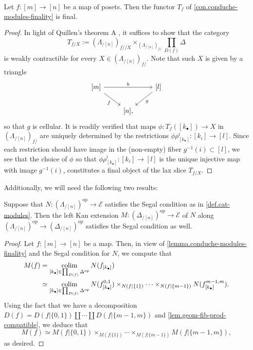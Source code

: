 \documentclass[a4paper, 11pt]{amsart}
\numberwithin{theorem}{section}
\theoremstyle{definition}
\newcommand{\op}{\mathrm{op}}
\def\colim{\qopname\relax m{colim}}
\newcommand{\E}{\mathscr{E}}
\begin{document}
\begin{lemma}\label{lemma.conduche-modules-finality}
	Let $f : [m] \rightarrow [n]$ be a map of posets. Then the functor $T_f$ of \cref{con.conduche-modules-finality} is final.
\end{lemma}
\begin{proof}
	In light of Quillen's theorem A \cite[Theorem 4.1.3.1]{HTT}, it suffices to show that the category 
	$$
	\textstyle T_{f/X} := (\Lambda_{/[n]})_{f//X} \times_{(\Lambda_{/[n]})_{f/}}\prod_{D(f)}\Delta
	$$
	is weakly contractible for every $X \in (\Lambda_{/[n]})_{f/}$. Note that such $X$ is given by a triangle 
	\[
		\begin{tikzcd}
			{[m]} \arrow[rr, "h"]\arrow[dr, "f"'] && {[l]} \arrow[dl, "{g}"] \\ 
			& {[n]},
		\end{tikzcd}
	\]
	so that $g$ is cellular. It is readily verified that maps $\phi : T_f([k_\bullet]) \rightarrow X$ in $(\Lambda_{/[n]})_{f/}$
	are uniquely determined by the restrictions $\phi\rho^i_{[k_\bullet]} : [k_i] \rightarrow [l]$. 
	Since each restriction should have image in the (non-empty) fiber $g^{-1}(i) \subset [l]$, 
	we see that the choice of $\phi$ so that 
	$
	\phi\rho^i_{[k_\bullet]} : [k_i] \rightarrow [l]
	$
	is the unique injective map with image $g^{-1}(i)$, constitutes a final object of the lax slice $T_{f/X}$.  
\end{proof}

Additionally, we will need the following two results:

\begin{lemma}\label{lemma.conduche-modules-kan-extension}
	Suppose that $N : (\Lambda_{/[n]})^\op \rightarrow \E$ satisfies the Segal condition as in \cref{def.cat-modules}. Then 
	the left Kan extension $M : (\Delta_{/[n]})^\op \rightarrow \E$ of $N$ along $(\Lambda_{/[n]})^\op \rightarrow (\Delta_{/[n]})^\op$ satisfies the Segal condition as well.
\end{lemma}
\begin{proof} 
	Let $f : [m] \rightarrow [n]$ be a map. Then, in view of \cref{lemma.conduche-modules-finality} and the Segal condition 
	for $N$, we compute that
	\begin{align*}
		M(f) & = \colim_{[k_\bullet] \in \prod_{D(f)}\Delta^{\op}} N(f_{[k_\bullet]}) \\
		&\simeq \colim_{[k_\bullet] \in \prod_{D(f)}\Delta^{\op}} N(f^{0,1}_{[k_\bullet]}) \times_{N(f|\{1\})} \dotsb \times_{N(f|\{m-1\})} N(f^{m-1,m}_{[k_\bullet]}).
	\end{align*}
	Using the fact that we have a decomposition $D(f) = D(f|\{0,1\}) \coprod \dotsb \coprod D(f|\{m-1,m\})$ 
	and \cref{lem.geom-fib-prod-compatible}, we deduce that 
	$$
	M(f) \simeq M(f|\{0,1\}) \times_{M(f|\{1\})} \dotsb \times_{M(f|\{m-1\})} M(f|\{m-1,m\}),
	$$
	as desired.
\end{proof}
\end{document}
